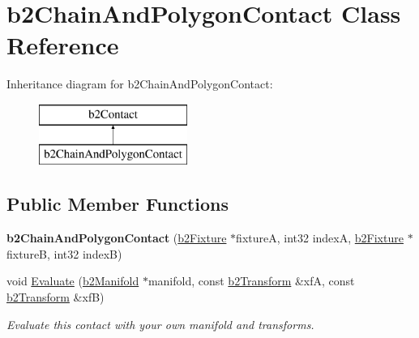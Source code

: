 \hypertarget{classb2_chain_and_polygon_contact}{\section{b2\-Chain\-And\-Polygon\-Contact Class Reference}
\label{classb2_chain_and_polygon_contact}
}
Inheritance diagram for b2\-Chain\-And\-Polygon\-Contact\-:\begin{figure}[H]
\begin{center}
\leavevmode
\includegraphics[height=2.000000cm]{classb2_chain_and_polygon_contact}
\end{center}
\end{figure}
\subsection*{Public Member Functions}
\begin{DoxyCompactItemize}
\item 
\hypertarget{classb2_chain_and_polygon_contact_ae43cd05c72ccaeb5f03efc5df944648b}{{\bfseries b2\-Chain\-And\-Polygon\-Contact} (\hyperlink{classb2_fixture}{b2\-Fixture} $\ast$fixture\-A, int32 index\-A, \hyperlink{classb2_fixture}{b2\-Fixture} $\ast$fixture\-B, int32 index\-B)}\label{classb2_chain_and_polygon_contact_ae43cd05c72ccaeb5f03efc5df944648b}

\item 
\hypertarget{classb2_chain_and_polygon_contact_a8c25ceb49d981797d0a7f8a1ea769442}{void \hyperlink{classb2_chain_and_polygon_contact_a8c25ceb49d981797d0a7f8a1ea769442}{Evaluate} (\hyperlink{structb2_manifold}{b2\-Manifold} $\ast$manifold, const \hyperlink{structb2_transform}{b2\-Transform} \&xf\-A, const \hyperlink{structb2_transform}{b2\-Transform} \&xf\-B)}\label{classb2_chain_and_polygon_contact_a8c25ceb49d981797d0a7f8a1ea769442}

\begin{DoxyCompactList}\small\item\em Evaluate this contact with your own manifold and transforms. \end{DoxyCompactList}\end{DoxyCompactItemize}
